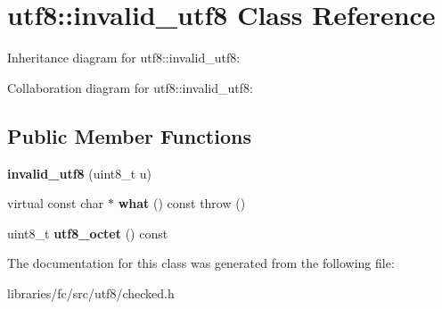\hypertarget{classutf8_1_1invalid__utf8}{}\section{utf8\+:\+:invalid\+\_\+utf8 Class Reference}
\label{classutf8_1_1invalid__utf8}


Inheritance diagram for utf8\+:\+:invalid\+\_\+utf8\+:


Collaboration diagram for utf8\+:\+:invalid\+\_\+utf8\+:
\subsection*{Public Member Functions}
\begin{DoxyCompactItemize}
\item 
\mbox{\label{classutf8_1_1invalid__utf8_a161e63ef9ceb25f5e916d7b580d001a0}} 
{\bfseries invalid\+\_\+utf8} (uint8\+\_\+t u)
\item 
\mbox{\label{classutf8_1_1invalid__utf8_a2d13bf1360bc4cca419f5ca9b666db20}} 
virtual const char $\ast$ {\bfseries what} () const  throw ()
\item 
\mbox{\label{classutf8_1_1invalid__utf8_af55a81b00bd7a0bd3fc59b993fbcfaea}} 
uint8\+\_\+t {\bfseries utf8\+\_\+octet} () const
\end{DoxyCompactItemize}


The documentation for this class was generated from the following file\+:\begin{DoxyCompactItemize}
\item 
libraries/fc/src/utf8/checked.\+h\end{DoxyCompactItemize}

